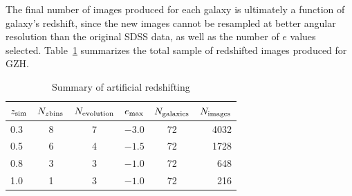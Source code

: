 \documentclass[twocolumn]{aastex6}
\begin{document}
The final number of \ferengi{} images produced for each galaxy is ultimately a function of galaxy's redshift, since the new images cannot be resampled at better angular resolution than the original SDSS data, as well as the number of $e$ values selected. Table~\ref{tbl:ferengivalues} summarizes the total sample of redshifted images produced for GZH. 

\begin{table}
\caption{Summary of \ferengi{} artificial redshifting \label{tbl:ferengivalues}}
\begin{tabular}{lccccr}
\hline\hline
$z_{\rm sim}$ & $N_{z {\rm bins}}$ & $N_{\rm evolution}$ & $e_{\rm max}$ & $N_{\rm galaxies}$ & $N_{\rm images}$\\
\hline
0.3              & 8                  & 7                   & $-3.0$        & 72             & 4032 \\
0.5              & 6                  & 4                   & $-1.5$        & 72             & 1728 \\
0.8              & 3                  & 3                   & $-1.0$        & 72             &  648 \\
1.0              & 1                  & 3                   & $-1.0$        & 72             &  216 \\
\hline\hline
\end{tabular}
\end{table}
\end{document}
